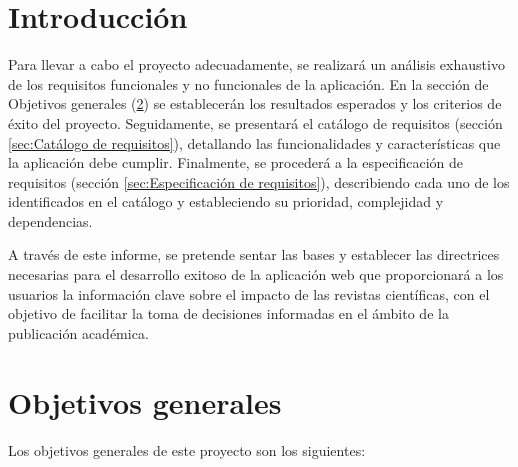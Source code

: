 
\section{Introducción}

Para llevar a cabo el proyecto adecuadamente, se realizará un análisis exhaustivo de los requisitos funcionales y no funcionales de la aplicación. En la sección de Objetivos generales (\ref{sec:Objetivos generales}) se establecerán los resultados esperados y los criterios de éxito del proyecto. Seguidamente, se presentará el catálogo de requisitos (sección \ref{sec:Catálogo de requisitos}), detallando las funcionalidades y características que la aplicación debe cumplir. Finalmente, se procederá a la especificación de requisitos (sección \ref{sec:Especificación de requisitos}), describiendo cada uno de los identificados en el catálogo y estableciendo su prioridad, complejidad y dependencias.

A través de este informe, se pretende sentar las bases y establecer las directrices necesarias para el desarrollo exitoso de la aplicación web que proporcionará a los usuarios la información clave sobre el impacto de las revistas científicas, con el objetivo de facilitar la toma de decisiones informadas en el ámbito de la publicación académica.

\section{Objetivos generales}
\label{sec:Objetivos generales}

Los objetivos generales de este proyecto son los siguientes:

